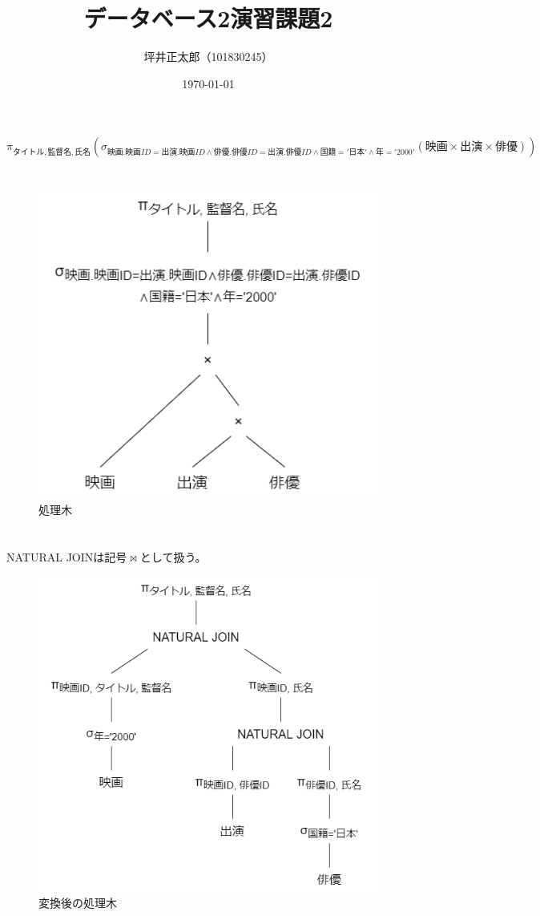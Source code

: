 \documentclass[a4paper,10pt]{jsarticle}
\begin{document}
\title{データベース2演習課題2}
\author{坪井正太郎（101830245）}
\date{\today}
\maketitle
\section{}
\[\pi_{タイトル, 監督名, 氏名}(\sigma_{映画.映画ID=出演.映画ID\wedge  俳優.俳優ID=出演.俳優ID\wedge 国籍='日本'\wedge 年='2000'}(映画\times 出演\times 俳優))\]

\section{}
\begin{figure}[H]
  \centering
  \includegraphics[width=12cm]{01.drawio.png}
  \caption{処理木}
  \label{処理木}
\end{figure}

\section{}
NATURAL JOINは記号$\Join$として扱う。
\begin{figure}[H]
  \centering
  \includegraphics[width=12cm]{02.drawio.png}
  \caption{変換後の処理木}
  \label{変換後の処理木}
\end{figure}
\end{document}
